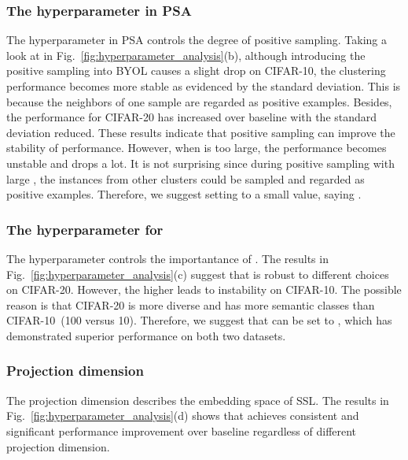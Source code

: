\subsubsection{The hyperparameter  in PSA} 
The hyperparameter  in PSA controls the degree of positive sampling. Taking a look at  in Fig.~\ref{fig:hyperparameter_analysis}(b), although introducing the positive sampling into BYOL causes a slight drop on CIFAR-10, the clustering performance becomes more stable as evidenced by the standard deviation. This is because the neighbors of one sample are regarded as positive examples. Besides, the performance for CIFAR-20 has increased over baseline with the standard deviation reduced. These results indicate that positive sampling can improve the stability of performance. However, when  is too large, the performance becomes unstable and drops a lot. It is not surprising since during positive sampling with large , the instances from other clusters could be sampled and regarded as positive examples. Therefore, we suggest setting   to a small value, saying .



\subsubsection{The hyperparameter  for \lossname} 
The hyperparameter  controls the importantance of \lossname. The results in Fig.~\ref{fig:hyperparameter_analysis}(c) suggest that \methodname is robust to different choices on CIFAR-20. However, the higher  leads to instability on CIFAR-10. The possible reason is that CIFAR-20 is more diverse and has more semantic classes than CIFAR-10~(100 versus 10). Therefore, we suggest that  can be set to , which has demonstrated superior performance on both two datasets.

\subsubsection{Projection dimension} 
The projection dimension describes the embedding space of SSL. The results in Fig.~\ref{fig:hyperparameter_analysis}(d) shows that \methodname achieves consistent and significant performance improvement over baseline regardless of different projection dimension.

